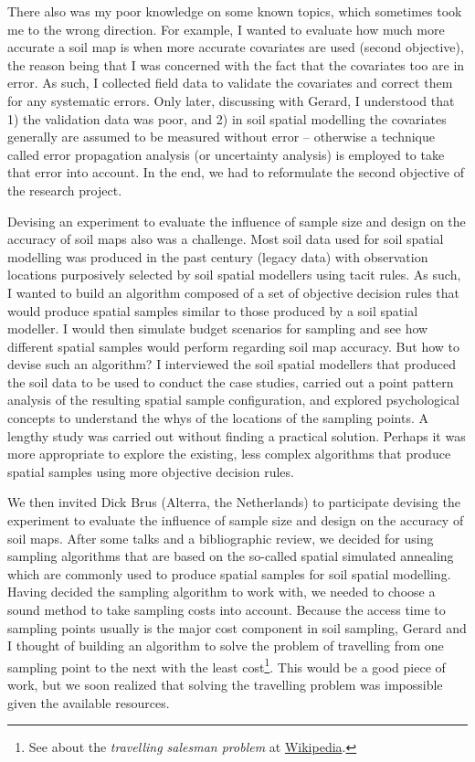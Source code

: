 There also was my poor knowledge on some known topics, which sometimes took me to the wrong direction. For 
example, I wanted to evaluate how much more accurate a soil map is when more accurate covariates are used 
(second objective), the reason being that I was concerned with the fact that the covariates too are in error. 
As 
such, I collected field data to validate the covariates and correct them for any systematic errors. Only 
later, 
discussing with Gerard, I understood that 1) the validation data was poor, and 2) in soil spatial modelling 
the 
covariates generally are assumed to be measured without error -- otherwise a technique called error 
propagation 
analysis (or uncertainty analysis) is employed to take that error into account. In the end, we had to 
reformulate the second objective of the research project.

Devising an experiment to evaluate the influence of sample size and design on the accuracy of soil maps also 
was a challenge. Most soil data used for soil spatial modelling was produced in the past century (legacy data) 
with observation locations purposively selected by soil spatial modellers using tacit rules. As such, I wanted 
to build an algorithm composed of a set of objective decision rules that would produce spatial samples similar 
to those produced by a soil spatial modeller. I would then simulate budget scenarios for sampling and see how 
different spatial samples would perform regarding soil map accuracy. But how to devise such an algorithm? I 
interviewed the soil spatial modellers that produced the soil data to be used to conduct the case studies,
carried out a point pattern analysis of the resulting spatial sample configuration, and explored psychological 
concepts to understand the whys of the locations of the sampling points. A lengthy study was carried out 
without finding a practical solution. Perhaps it was more appropriate to explore the existing, less complex 
algorithms that produce spatial samples using more objective decision rules.

\def\foottravel{See about the \emph{travelling salesman problem} at 
\href{https://en.wikipedia.org/wiki/Travelling_salesman_problem}{Wikipedia}.}

We then invited Dick Brus (Alterra, the Netherlands) to participate devising the experiment to evaluate the 
influence of sample size and design on the accuracy of soil maps. After some talks and a bibliographic review, 
we decided for using sampling algorithms that are based on the so-called spatial simulated annealing which are 
commonly used to produce spatial samples for soil spatial modelling. Having decided the sampling algorithm to 
work with, we needed to choose a sound method to take sampling costs into account. Because the access time to 
sampling points usually is the major cost component in soil sampling, Gerard and I thought of building an 
algorithm to solve the problem of travelling from one sampling point to the next with the least 
cost\footnote{\foottravel}. This would be a good piece of work, but we soon realized that solving the 
travelling problem was impossible given the available resources.

